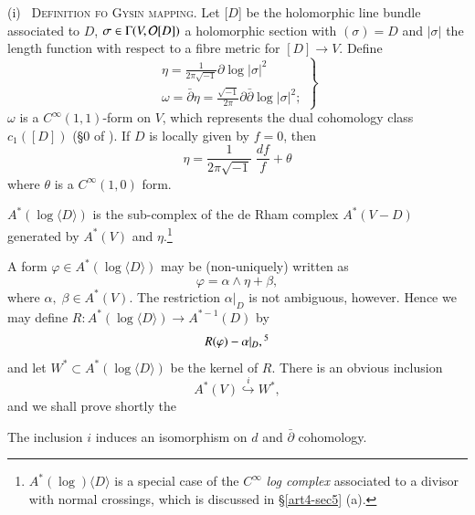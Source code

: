 \medskip
\noindent
(i)~ \textsc{Definition fo Gysin mapping.} Let [$D$] be the holomorphic line bundle associated to $D$, $\sigma \in \Gamma (V, \mathcal{O}[D])$ a holomorphic section with $(\sigma) = D$ and $|\sigma|$ the length function with respect to a fibre metric for $[D] \to V$. Define
\begin{equation}
\left.
\begin{matrix}
\eta = \frac{1}{2\pi \sqrt{-1}} \partial \log |\sigma|^2 \\[0.2cm]
\omega = \bar{\partial} \eta = \frac{\sqrt{-1}}{2\pi} \partial \bar{\partial} \log |\sigma|^2 ; 
\end{matrix}
\right\}
\label{art4-eq2.15}
\end{equation}
$\omega$ is a $C^\infty(1,1)$-form on $V$, which represents the dual cohomology class $c_1 ([D])$ (\cf \S 0 of \cite{art4-key24}). If $D$ is locally given by $f =0$, then 
$$
\eta = \frac{1}{2 \pi \sqrt{-1}}  \; \frac{df}{f} + \theta
$$
where $\theta$ is a $C^\infty (1,0)$ form.

\begin{defi*}
$A^\ast (\log \langle D \rangle)$ is the sub-complex of the de Rham complex $A^\ast (V-D)$ generated by $A^\ast (V)$ and $\eta$.\footnote[4]{$A^\ast (\log) \langle D \rangle$ is a special case of the $C^\infty$ \textit{log complex} associated to a divisor with normal crossings, which is discussed in \S \ref{art4-sec5} (a).
}
\end{defi*}

A form $\varphi \in A^\ast (\log \langle D \rangle)$  may be (non-uniquely) written as 
\begin{equation}
\varphi = \alpha \wedge \eta + \beta, \label{art4-eq2.16}
\end{equation}
where $\alpha, \; \beta \in A^\ast (V)$. The restriction $\alpha |_{D}$ is not ambiguous, however. Hence we may define $R: A^\ast (\log \langle D \rangle) \to A^{\ast-1} (D)$ by
\begin{equation}
R (\varphi) - \alpha |_{D}, \footnotemark[5]{} 
\label{art4-eq2.17}
\end{equation}\pageoriginale
and let $W^\ast \subset A^\ast (\log \langle D \rangle)$ be the kernel of $R$. There is an obvious inclusion
$$
A^\ast (V) {\displaystyle{\mathop{\hookrightarrow}\limits^i}} W^\ast,
$$
and we shall prove shortly the 

\setcounter{proposition}{17}
\begin{proposition}\label{art4-prop2.18}
The inclusion $i$ induces an isomorphism on $d$ and $\bar{\partial}$ cohomology.
\end{proposition}

